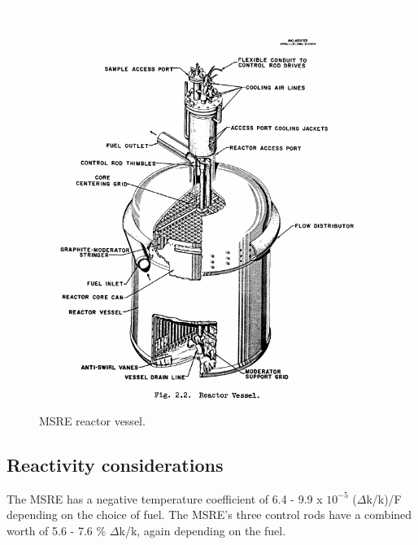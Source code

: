\documentclass{article}
\begin{document}
\begin{figure}[htpb]
  \centering
  \includegraphics{MSRE_reactor_vessel.png}
  \caption{MSRE reactor vessel. \cite{robertson_msre_1965}}
  \label{fig:MSRE_reactor}
\end{figure}

\subsection{Reactivity considerations}

The MSRE has a negative temperature coefficient of 6.4 - 9.9 x $10^{-5}$
($\Delta$k/k)/\textdegree F depending on the choice of
fuel. \cite{robertson_msre_1965} The MSRE's three control rods have a combined
worth of 5.6 - 7.6 \% $\Delta$k/k, again depending on the
fuel. \cite{robertson_msre_1965}
\end{document}
